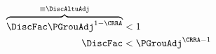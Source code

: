   \begin{equation}\begin{gathered}\begin{aligned}
    \overbrace{\DiscFac \PGrouAdj^{1-\CRRA} }^{\equiv \DiscAltuAdj}  & < 1  
    \\ \DiscFac  & < \PGrouAdj^{\CRRA-1} \label{eq:FVAC}
  \end{aligned}\end{gathered}\end{equation}
